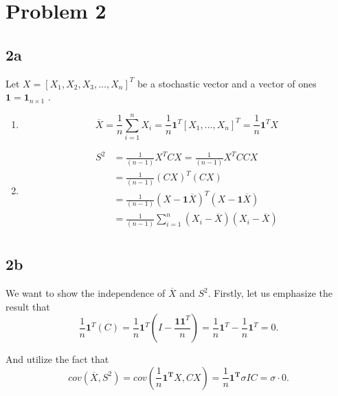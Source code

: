 \documentclass{article}
\theoremstyle{remark}
\begin{document}
\newpage
\section*{Problem 2}%
\label{sec:problem_2}

\subsection*{2a}%
\label{sub:2a}
Let  $ X= [ X_{1}, X_{2}, X_{3}, \ldots , X_{n} ]^{T}$ be a stochastic vector and a vector of ones $\mathbf{1} = \mathbf{1}_{n \times  1}$ .
\begin{enumerate}[label=(\roman*)]
    \item \[
\overline{X} = \frac{1}{n} \sum_{i=1}^{n}  X_{i} = \frac{1}{n}\mathbf{1}^{T}\left[ X_{1}, \ldots, X_{n}
        \right]^{T}  = \frac{1}{n}\mathbf{1}^{T}  X
    \]
\item  \[
\begin{split}
    S^{2} & = \frac{1}{\left( n-1 \right)} X^{T } CX  = \frac{1}{\left( n-1 \right)} X^{T} C C X \\
    &=  \frac{1}{\left( n-1 \right)} \left( CX \right)^{T} \left( CX \right) \\
    &=  \frac{1}{\left( n-1 \right)} \left( X- \mathbf{1} \overline{X}  \right)^{T} \left( X- \mathbf{1} \overline{X}  \right)\\
    &=  \frac{1}{\left( n-1 \right)} \sum_{i=1}^{n} \left( X_{i} - \overline{X}  \right)\left( X_{i} - \overline{X}  \right) \\
\end{split}
\]
\end{enumerate}



\subsection*{2b}%
\label{sub:2b}

We want to show the independence of $\overline{X} $  and $S^{2}$. Firstly,  let us emphasize the result that \[
      \displaystyle  \frac{1}{n} \mathbf{1} ^{T} \left( C \right) = \frac{1}{n} \mathbf{1}^{T} \left( I -
        \frac{\mathbf{1}\mathbf{1}^{T}}{n} \right) = \frac{1}{n} \mathbf{1}^{T} - \frac{1}{n} \mathbf{1}^{T} = 0.
\]

And utilize the fact that \[
    cov\left( \overline{X} , S^{2} \right) = cov\left( \frac{1}{n} \mathbf{1^{T}} X, C X \right)  = \frac{1}{n}
    \mathbf{1^{T}} \sigma I C = \sigma \cdot 0.
\]
\end{document}
